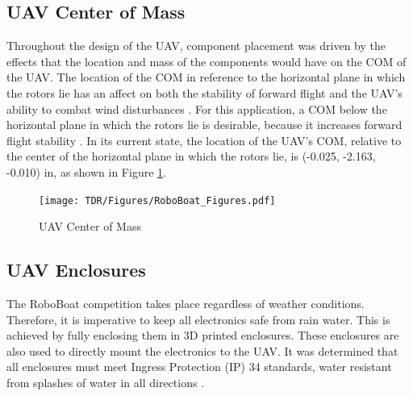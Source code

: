 \documentclass[letterpaper, 12 pt, conference]{ieeeconf}
\begin{document}
%
\subsection{UAV Center of Mass}
% 
Throughout the design of the UAV, component placement was driven by the effects that the location and mass of the components would have on the COM of the UAV. The location of the COM in reference to the horizontal plane in which the rotors lie has an affect on both the stability of forward flight and the UAV's ability to combat wind disturbances \cite{compaper}. For this application, a COM below the horizontal plane in which the rotors lie is desirable, because it increases forward flight stability \cite{compaper}. In its current state, the location of the UAV's COM, relative to the center of the horizontal plane in which the rotors lie, is (-0.025, -2.163, -0.010) in, as shown in Figure \ref{fig:com}. 
%
\begin{figure}[tb]
\vspace{0.05in}
\centering
\texttt{[image: TDR/Figures/RoboBoat\_Figures.pdf]}
\caption{UAV Center of Mass}
\label{fig:com}
\end{figure}
\subsection{UAV Enclosures}
% 
The RoboBoat competition takes place regardless of weather conditions. Therefore, it is imperative to keep all electronics safe from rain water. This is achieved by fully enclosing them in 3D printed enclosures. These enclosures are also used to directly mount the electronics to the UAV. It was determined that all enclosures must meet Ingress Protection (IP) 34 standards, water resistant from splashes of water in all directions \cite{IP}. 
\end{document}
